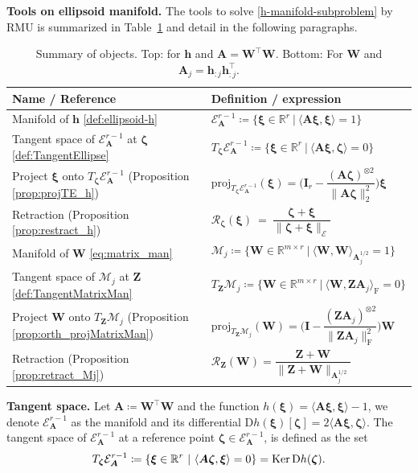 \documentclass[sn-mathphys-num]{sn-jnl}
\def\proj            {\textrm{proj}}     %
\def\IR  {\mathbb{R}} 	    %
\def\IRr {\IR^{r}} 			%
\def\IRmr{\IR^{m \times r}} %
\def\A {\bm{A}}
\def\I {\bm{I}}
\def\W {\bm{W}}
\def\Z {\bm{Z}}
\def\h {\bm{h}}
\def\cE { \mathcal{E}}
\def\cM { \mathcal{M}}
\def\cR { \mathcal{R}}
\def\bzeta    {\boldsymbol{\zeta}}
\def\bxi      {\boldsymbol{\xi}}
\begin{document}
\noindent\textbf{Tools on ellipsoid manifold.}
The tools to solve \eqref{h-manifold-subproblem} by RMU is summarized in Table~\ref{table:manifold} and detail in the following paragraphs.
\begin{table}[h]
\centering
\caption{Summary of objects.
Top: for $\h$ and $\A = \W^\top \W$.
Bottom: For $\W$ and $\A_j = \h_{:j}\h_{:j}^\top$.
}
\label{table:manifold}
\renewcommand*{\arraystretch}{1.6}
\begin{tabular}{ll}
Name / Reference &   Definition / expression         
\\ \hline \hline
Manifold of $\h$ \eqref{def:ellipsoid-h}  & 
$\cE_{\A}^{r-1} \coloneqq 
\Big\{
\bxi \in \IRr ~\big|~ \langle \A \bxi, \bxi \big\rangle = 1
\Big\}
$
\\
Tangent space of $\cE_{\A}^{r-1}$ at $\bzeta$ 
\eqref{def:TangentEllipse}
&
$T_{\bzeta} \cE_{\A}^{r-1}  \coloneqq 
\Big\{
\bxi \in \IRr ~\big|~ \langle \A \bxi, \bzeta \big\rangle = 0
\Big\}$
\\
Project $\bxi$ onto $T_{\bzeta}\cE_{\A}^{r-1}$ (Proposition\,\ref{prop:projTE_h})  & 
$\proj_{T_{\bzeta}\cE_{\A}^{r-1}}(\bxi)
=
\bigg(
\I_r-
\dfrac{(\A\bzeta)^{\otimes2}}{\|\A\bzeta\|_2^2}
\bigg)\bxi
$
\\
Retraction (Proposition\,\ref{prop:restract_h})
& 
$\cR_{\bzeta}(\bxi) 
~=~ 
\dfrac{\bzeta + \bxi}{\| \bzeta + \bxi \|_\cE} 
$
\\ \hline 
Manifold of $\W$ \eqref{eq:matrix_man} &
$\cM_j \coloneqq \Big\{
\W \in \IRmr ~\big|~ \langle \W, \W \big\rangle_{\A_j^{1/2}} = 1
\Big\}
$
\\
Tangent space of $\cM_j$ at $\Z$ \eqref{def:TangentMatrixMan}
& 
$T_{\Z} \cM_j  \coloneqq 
\Big\{
\W \in \IRmr ~\big|~ \langle \W ,\Z \A_j \big\rangle_\textrm{F} = 0
\Big\}$
\\
Project $\W$ onto $T_{\Z}\cM_j$ (Proposition\,\ref{prop:orth_projMatrixMan}) & 
$\proj_{T_{\Z}\cM_j}(\W)
= 
\bigg(\I-
\dfrac{ (\Z\A_j)^{\otimes 2}}{
\|\Z\A_j\|_\textrm{F}^2}\bigg) 
\W
$
\\
Retraction (Proposition\,\ref{prop:retract_Mj})
&
$
\cR_{\Z}(\W)
= 
\dfrac{\Z+\W}{\|\Z+\W\|_{\A_j^{1/2}}
}
$
\end{tabular}
\end{table}


\noindent\textbf{Tangent space.}
Let $\A \coloneqq \W^\top\W$ and the function $h(\bxi) = \langle \A\bxi, \bxi \rangle - 1$, we denote $\cE_{\A}^{r-1}$ as the manifold and its differential $\textrm{D}h(\bxi)[\bzeta] = 2 \langle \A\bxi, \bzeta \rangle$.
The tangent space of $\cE_{\A}^{r-1}$ at a reference point $\bzeta \in \cE_{\A}^{r-1}$, is defined as the set
\begin{equation}\label{def:TangentEllipse}
T_{\bzeta}\cE_{\A}^{r-1}
\coloneqq  \{ \bxi \in \IRr ~|~ \langle \A\bzeta, \bxi \rangle  = 0 \}
= \textrm{Ker\,D}h(\bzeta).
\end{equation}
\end{document}
